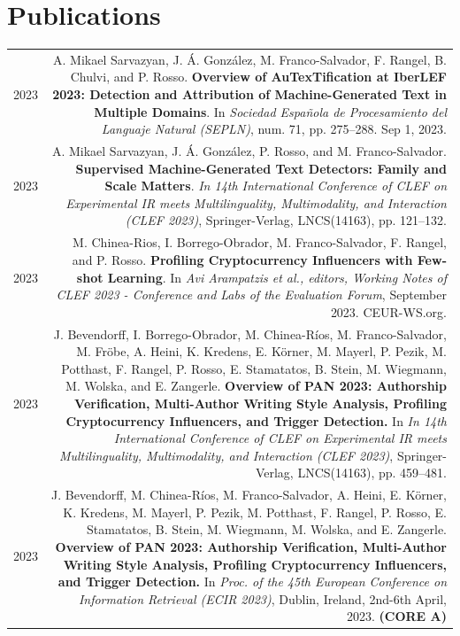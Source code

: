 \documentclass[10pt]{article}
\begin{document}
\section*{Publications}
\begin{tabular}{L!{\VRule}R}
    2023 & A. Mikael Sarvazyan, J. Á. González, M. Franco-Salvador, F. Rangel, B. Chulvi, and P. Rosso. \textbf{Overview of AuTexTification at IberLEF 2023: Detection and Attribution of Machine-Generated Text in Multiple Domains}. In \emph{Sociedad Española de Procesamiento del Languaje Natural (SEPLN)}, num. 71, pp. 275--288. Sep 1, 2023. \vspace{5pt}\\
    2023 & A. Mikael Sarvazyan, J. Á. González, P. Rosso, and M. Franco-Salvador. \textbf{Supervised Machine-Generated Text Detectors: Family and Scale Matters}. \emph{In 14th International Conference of CLEF on Experimental IR meets Multilinguality, Multimodality, and Interaction (CLEF 2023)}, Springer-Verlag, LNCS(14163), pp. 121--132. \vspace{5pt}\\
    2023 &  M. Chinea-Rios, I. Borrego-Obrador, M. Franco-Salvador, F. Rangel, and P. Rosso. \textbf{Profiling Cryptocurrency Influencers with Few-shot Learning}. In \emph{Avi Arampatzis et al., editors, Working Notes of CLEF 2023 - Conference and Labs of the Evaluation Forum}, September 2023. CEUR-WS.org. \vspace{5pt}\\
    2023 & J. Bevendorff, I. Borrego-Obrador, M. Chinea-Ríos, M. Franco-Salvador, M. Fröbe, A. Heini, K. Kredens, E. Körner, M. Mayerl, P. Pezik, M. Potthast, F. Rangel, P. Rosso, E. Stamatatos, B. Stein, M. Wiegmann, M. Wolska, and E. Zangerle. \textbf{Overview of PAN 2023: Authorship Verification, Multi-Author Writing Style Analysis, Profiling Cryptocurrency Influencers, and Trigger Detection.} In \emph{In 14th International Conference of CLEF on Experimental IR meets Multilinguality, Multimodality, and Interaction (CLEF 2023)}, Springer-Verlag, LNCS(14163), pp. 459--481. \vspace{5pt}\\
    2023 & J. Bevendorff, M. Chinea-Ríos, M. Franco-Salvador, A. Heini, E. Körner, K. Kredens, M. Mayerl, P. Pezik, M. Potthast, F. Rangel, P. Rosso, E. Stamatatos, B. Stein, M. Wiegmann, M. Wolska, and E. Zangerle. \textbf{Overview of PAN 2023: Authorship Verification, Multi-Author Writing Style Analysis, Profiling Cryptocurrency Influencers, and Trigger Detection.} In \emph{Proc. of the 45th European Conference on Information Retrieval (ECIR 2023)}, Dublin, Ireland, 2nd-6th April, 2023. \textbf{(CORE A)} \vspace{5pt}\\

\end{tabular}
\end{document}
